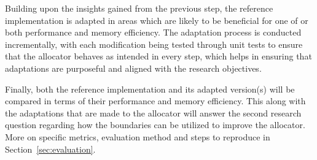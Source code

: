 Building upon the insights gained from the previous step, the reference implementation is adapted in areas which are likely to be beneficial for one of or both performance and memory efficiency. The adaptation process is conducted incrementally, with each modification being tested through unit tests to ensure that the allocator behaves as intended in every step, which helps in ensuring that adaptations are purposeful and aligned with the research objectives. 

Finally, both the reference implementation and its adapted version(s) will be compared in terms of their performance and memory efficiency. This along with the adaptations that are made to the allocator will answer the second research question regarding how the boundaries can be utilized to improve the allocator. More on specific metrics, evaluation method and steps to reproduce in Section~\ref{sec:evaluation}.

